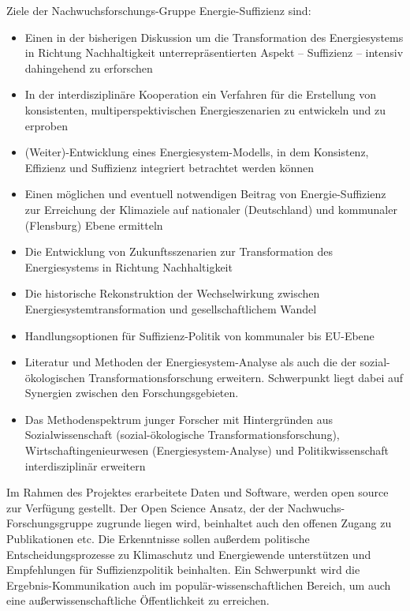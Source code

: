 \documentclass[a4paper,11pt,twoside]{scrartcl}
\begin{document}
Ziele der Nachwuchsforschungs-Gruppe Energie-Suffizienz sind:
\begin{itemize}
 \item Einen in der bisherigen Diskussion um die Transformation des Energiesystems in Richtung Nachhaltigkeit unterrepräsentierten Aspekt  -- Suffizienz -- intensiv dahingehend zu erforschen
  \item In der interdisziplinäre Kooperation ein Verfahren für die Erstellung von konsistenten, multiperspektivischen  Energieszenarien zu entwickeln und zu erproben
  \item (Weiter)-Entwicklung eines Energiesystem-Modells, in dem Konsistenz, Effizienz und Suffizienz integriert betrachtet werden können
 \item Einen möglichen und eventuell notwendigen Beitrag von Energie-Suffizienz zur Erreichung der Klimaziele auf nationaler (Deutschland) und kommunaler (Flensburg) Ebene ermitteln
 \item Die Entwicklung von Zukunftsszenarien zur Transformation des Energiesystems in Richtung Nachhaltigkeit 
 \item Die historische Rekonstruktion der Wechselwirkung zwischen Energiesystemtransformation und gesellschaftlichem Wandel  
 \item Handlungsoptionen für Suffizienz-Politik von kommunaler bis EU-Ebene
 \item Literatur und Methoden der Energiesystem-Analyse als auch die der sozial-ökologischen Transformationsforschung erweitern. Schwerpunkt liegt dabei auf Synergien zwischen den Forschungsgebieten.
 \item Das Methodenspektrum junger Forscher mit Hintergründen aus Sozialwissenschaft (sozial-ökologische Transformationsforschung), Wirtschaftingenieurwesen (Energiesystem-Analyse) und Politikwissenschaft interdisziplinär erweitern
\end{itemize}

Im Rahmen des Projektes erarbeitete Daten und Software, werden open source zur Verfügung gestellt. Der Open Science Ansatz, der der Nachwuchs-Forschungsgruppe zugrunde liegen wird, beinhaltet auch den offenen Zugang zu Publikationen etc. Die Erkenntnisse sollen außerdem politische Entscheidungsprozesse zu Klimaschutz und Energiewende unterstützen und Empfehlungen für Suffizienzpolitik beinhalten. Ein Schwerpunkt wird die Ergebnis-Kommunikation auch im populär-wissenschaftlichen Bereich, um auch eine außerwissenschaftliche Öffentlichkeit zu erreichen.
\end{document}
